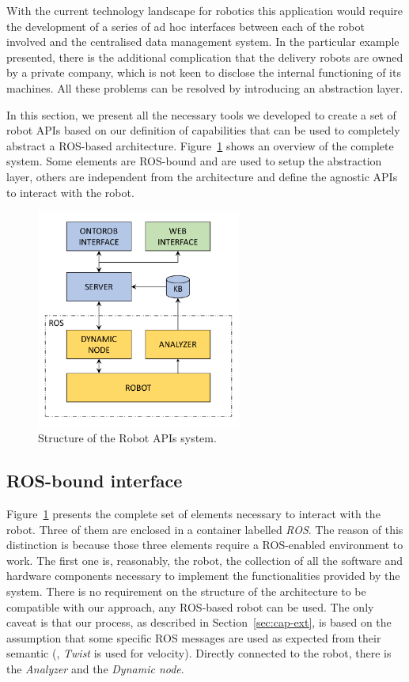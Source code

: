 With the current technology landscape for robotics this application would require the development of a series of ad hoc interfaces between each of the robot involved and the centralised data management system. In the particular example presented, there is the additional complication that the delivery robots are owned by a private company, which is not keen to disclose the internal functioning of its machines.  All these problems can be resolved by introducing an abstraction layer. 

In this section, we present all the necessary tools we developed to create a set of robot APIs based on our definition of capabilities that can be used to completely abstract a ROS-based architecture. Figure~\ref{fig:robot-api} shows an overview of the complete system. Some elements are ROS-bound and are used to setup the abstraction layer, others are independent from the architecture and define the agnostic APIs to interact with the robot.

\begin{figure}[t]
    \centering
    \includegraphics[width=0.6\textwidth]{gfx/onto/robot_api5}
    \caption{Structure of the Robot APIs system.}\label{fig:robot-api}
\end{figure}

\subsection{ROS-bound interface}
Figure~\ref{fig:robot-api} presents the complete set of elements necessary to interact with the robot. Three of them are enclosed in a container labelled \textit{ROS}. The reason of this distinction is because those three elements require a ROS-enabled environment to work. The first one is, reasonably, the robot, the collection of all the software and hardware components necessary to implement the functionalities provided by the system. There is no requirement on the structure of the architecture to be compatible with our approach, any ROS-based robot can be used. The only caveat is that our process, as described in Section~\ref{sec:cap-ext}, is based on the assumption that some specific ROS messages are used as expected from their semantic (\eg, \textit{Twist} is used for velocity). Directly connected to the robot, there is the \textit{Analyzer} and the \textit{Dynamic node}.

